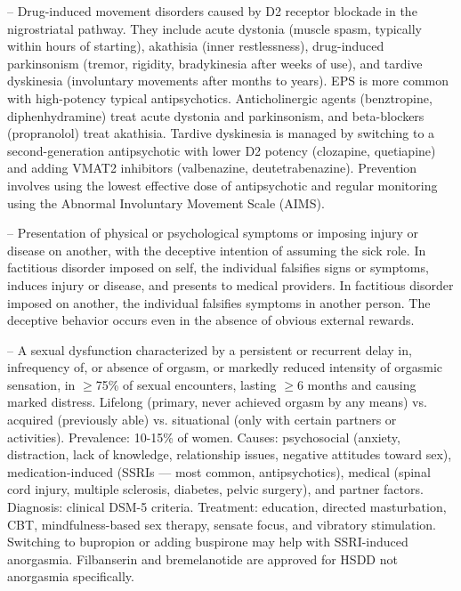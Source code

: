 -- Drug-induced movement disorders caused by D2 receptor blockade in the nigrostriatal pathway. They include acute dystonia (muscle spasm, typically within hours of starting), akathisia (inner restlessness), drug-induced parkinsonism (tremor, rigidity, bradykinesia after weeks of use), and tardive dyskinesia (involuntary movements after months to years). EPS is more common with high-potency typical antipsychotics. Anticholinergic agents (benztropine, diphenhydramine) treat acute dystonia and parkinsonism, and beta-blockers (propranolol) treat akathisia. Tardive dyskinesia is managed by switching to a second-generation antipsychotic with lower D2 potency (clozapine, quetiapine) and adding VMAT2 inhibitors (valbenazine, deutetrabenazine). Prevention involves using the lowest effective dose of antipsychotic and regular monitoring using the Abnormal Involuntary Movement Scale (AIMS).

-- Presentation of physical or psychological symptoms or imposing injury or disease on another, with the deceptive intention of assuming the sick role. In factitious disorder imposed on self, the individual falsifies signs or symptoms, induces injury or disease, and presents to medical providers. In factitious disorder imposed on another, the individual falsifies symptoms in another person. The deceptive behavior occurs even in the absence of obvious external rewards.

-- A sexual dysfunction characterized by a persistent or recurrent delay in, infrequency of, or absence of orgasm, or markedly reduced intensity of orgasmic sensation, in \(\ge\)75\% of sexual encounters, lasting \(\ge\)6 months and causing marked distress. Lifelong (primary, never achieved orgasm by any means) vs. acquired (previously able) vs. situational (only with certain partners or activities). Prevalence: 10-15\% of women. Causes: psychosocial (anxiety, distraction, lack of knowledge, relationship issues, negative attitudes toward sex), medication-induced (SSRIs — most common, antipsychotics), medical (spinal cord injury, multiple sclerosis, diabetes, pelvic surgery), and partner factors. Diagnosis: clinical DSM-5 criteria. Treatment: education, directed masturbation, CBT, mindfulness-based sex therapy, sensate focus, and vibratory stimulation. Switching to bupropion or adding buspirone may help with SSRI-induced anorgasmia. Filbanserin and bremelanotide are approved for HSDD not anorgasmia specifically.

